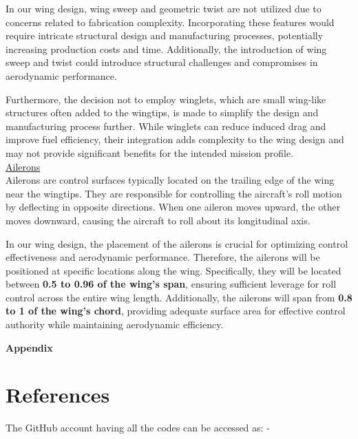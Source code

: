 \documentclass[12 pt]{article}
\begin{document}
In our wing design, wing sweep and geometric twist are not utilized due to concerns related to fabrication complexity. Incorporating these features would require intricate structural design and manufacturing processes, potentially increasing production costs and time. Additionally, the introduction of wing sweep and twist could introduce structural challenges and compromises in aerodynamic performance.

Furthermore, the decision not to employ winglets, which are small wing-like structures often added to the wingtips, is made to simplify the design and manufacturing process further. While winglets can reduce induced drag and improve fuel efficiency, their integration adds complexity to the wing design and may not provide significant benefits for the intended mission profile.\\
\vspace{5mm}
\color{red}
\large{\underline{Ailerons}}\\
\color{black}
Ailerons are control surfaces typically located on the trailing edge of the wing near the wingtips. They are responsible for controlling the aircraft's roll motion by deflecting in opposite directions. When one aileron moves upward, the other moves downward, causing the aircraft to roll about its longitudinal axis.

In our wing design, the placement of the ailerons is crucial for optimizing control effectiveness and aerodynamic performance. Therefore, the ailerons will be positioned at specific locations along the wing. Specifically, they will be located between \textbf{0.5 to 0.96 of the wing's span}, ensuring sufficient leverage for roll control across the entire wing length. Additionally, the ailerons will span from \textbf{0.8 to 1 of the wing's chord}, providing adequate surface area for effective control authority while maintaining aerodynamic efficiency.

\vfill

\clearpage

\newpage
\textbf{\Huge{Appendix}}
\appendix


\section{References}




\vspace{10 pt}

The GitHub account having all the codes can be accessed as: - 
\end{document}

